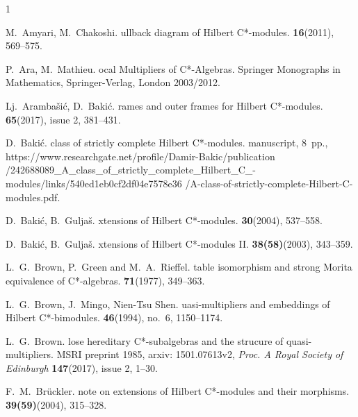 \documentclass{amsart}
\theoremstyle{definition}
\begin{document}
\begin{thebibliography}{1}

{\sc  M.~Amyari, M.~Chakoshi}.
ullback diagram of {H}ilbert {C}*-modules.
 {\bf 16}(2011), 569--575.

{\sc P.~Ara, M.~Mathieu}.
ocal {M}ultipliers of C*-{A}lgebras.
\newblock Springer Monographs in Mathematics, Springer-Verlag, London 2003/2012.

{\sc Lj.~Aramba{\v{s}}i\'c, D.~Baki\'c}.
rames and outer frames for {H}ilbert {C}*-modules.
 {\bf 65}(2017), issue 2, 381--431.

{\sc D.~Baki\'c}.
 class of strictly complete {H}ilbert {C}*-modules. 
\newblock manuscript, {8~pp.}, https://www.researchgate.net/profile/Damir-Bakic/publication \linebreak[4]
\newblock /242688089\_A\_class\_of\_strictly\_complete\_Hilbert\_C\_-modules/links/540ed1eb0cf2df04e7578e36 
\newblock /A-class-of-strictly-complete-Hilbert-C-modules.pdf.

{\sc D.~Baki\'c, B.~Gulja{\v{s}}}. 
xtensions of {H}ilbert {C}*-modules.
 {\bf 30}(2004), 537--558.

{\sc D.~Baki\'c, B.~Gulja{\v{s}}}. 
xtensions of {H}ilbert {C}*-modules II.
 {\bf 38(58)}(2003), 343--359.

{\sc L.~G.~Brown, P.~Green and M.~A.~Rieffel}.
table isomorphism and strong {M}orita equivalence of {C}*-algebras.
 {\bf 71}(1977), 349--363.

{\sc L.~G.~Brown, J.~Mingo, Nien-Tsu Shen}.
uasi-multipliers and embeddings of {H}ilbert {C}*-bimodules.
 {\bf 46}(1994), no.~6, 1150--1174.

{\sc L.~G.~Brown}.
lose hereditary {C}*-subalgebras and the strucure of quasi-multipliers.
\newblock MSRI preprint 1985, arxiv: 1501.07613v2, {\em Proc. A Royal Society of Edinburgh} {\bf 147}(2017), issue 2, 1--30.

{\sc F.~M.~Br\"uckler}.
 note on extensions of Hilbert C*-modules and their morphisms.
 {\bf 39(59)}(2004), 315--328.


\end{thebibliography}
\end{document}
